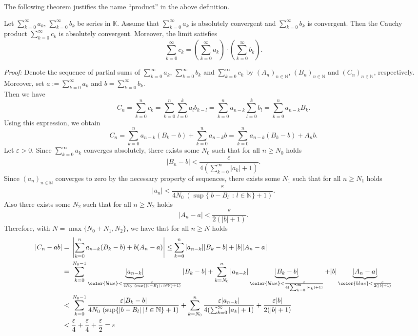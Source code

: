 The following theorem justifies the name ``product'' in the above definition.
\begin{Theorem}\label{thm:cprod}
Let $\sum_{k=0}^\infty a_k$, $\sum_{k=0}^\infty b_k$ be series in $\mathbb{K}$. Assume that $\sum_{k=0}^\infty a_k$ is absolutely convergent and $\sum_{k=0}^\infty b_k$ is convergent. Then the Cauchy product $\sum_{k=0}^\infty c_k$ is absolutely convergent. Moreover, the limit satisfies
\[\sum_{k=0}^\infty c_k=\left(\sum_{k=0}^\infty a_k\right)\cdot\left(\sum_{k=0}^\infty b_k\right).\]
\end{Theorem}
{\em Proof:}
Denote the sequence of partial sums of $\sum_{k=0}^\infty a_k$, $\sum_{k=0}^\infty b_k$ and $\sum_{k=0}^\infty c_k$ by $(A_n)_{n\in\mathbb{N}}$, $(B_n)_{n\in\mathbb{N}}$ and $(C_n)_{n\in\mathbb{N}}$, 
respectively. Moreover, set $a:=\sum_{k=0}^\infty a_k$ and $b=\sum_{k=0}^\infty b_k$.\\
Then we have 
\[C_n=\sum_{k=0}^nc_k=\sum_{k=0}^n\sum_{l=0}^ka_lb_{k-l}=\sum_{k=0}^na_{n-k}\sum_{l=0}^{k}b_l=\sum_{k=0}^na_{n-k}B_k.\]
Using this expression, we obtain
\[C_n=\sum_{k=0}^na_{n-k}(B_k-b)+\sum_{k=0}^na_{n-k}b=\sum_{k=0}^na_{n-k}(B_k-b)+A_nb.\]
Let $\varepsilon>0$. Since $\sum_{k=0}^\infty a_k$ converges absolutely, there exists some $N_0$ such that for all $n\geq N_{0}$ holds
\[|B_n-b|<\frac{\varepsilon}{4(\sum_{k=0}^{\infty}|a_k|+1)}.\]
Since $(a_{n})_{n\in\mathbb{N}}$ converges to zero by the necessary property of sequences, there exists some $N_1$ such that for all $n\geq N_{1}$ holds
\[|a_{n}|<\frac{\varepsilon}{4 N_{0}\ (\sup\{|b-B_l|\,:\,l\in\mathbb{N}\}+1)}.\]
Also there exists some $N_2$ such that for all $n\geq N_2$ holds
\[|A_{n}-a|<\frac{\varepsilon}{2(|b|+1)}.\]
Therefore, with $N=\max\{N_0+N_1,N_2\}$, we have that for all $n\geq N$ holds
\[
\begin{aligned}
|C_n-ab|=&\;\left|\sum_{k=0}^na_{n-k}(B_k-b)+b(A_n-a)\right|
\leq \sum_{k=0}^n|a_{n-k}||B_k-b|+|b||A_n-a|\\
=&\;\sum_{k=0}^{N_{0}-1}\underbrace{|a_{n-k}|}_{\color{blue}<\frac{\varepsilon}{4N_{0}\ (\sup\{|b-B_l|\,:\,l\in\mathbb{N}\}+1)}}|B_k-b|+
\sum_{k=N_{0}}^{n}|a_{n-k}|\underbrace{|B_k-b|}_{\color{blue}<\frac{\varepsilon}{4(\sum_{k=0}^{\infty}|a_k|+1)}}+
|b|\underbrace{|A_n-a|}_{\color{blue}<\frac{\varepsilon}{2(|b|+1)}}\\
<&\;\sum_{k=0}^{N_{0}-1}\frac{\varepsilon|B_k-b|}{4N_{0}\ (\sup\{|b-B_l|\,|\,l\in\mathbb{N}\}+1)}+
 \sum_{k=N_{0}}^{n}\frac{\varepsilon|a_{n-k}|}{4(\sum_{k=0}^{\infty}|a_k|+1)}+
 \frac{\varepsilon|b|}{2(|b|+1)}\\
<&\;\frac{\varepsilon}{4}+\frac{\varepsilon}{4}+\frac{\varepsilon}{2}=\varepsilon
\end{aligned}\]

